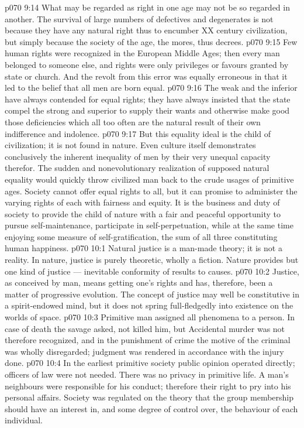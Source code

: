 \vs p070 9:14 What may be regarded as right in one age may not be so regarded in another. The survival of large numbers of defectives and degenerates is not because they have any natural right thus to encumber XX century civilization, but simply because the society of the age, the mores, thus decrees.
\vs p070 9:15 Few human rights were recognized in the European Middle Ages; then every man belonged to someone else, and rights were only privileges or favours granted by state or church. And the revolt from this error was equally erroneous in that it led to the belief that all men are born equal.
\vs p070 9:16 The weak and the inferior have always contended for equal rights; they have always insisted that the state compel the strong and superior to supply their wants and otherwise make good those deficiencies which all too often are the natural result of their own indifference and indolence.
\vs p070 9:17 But this equality ideal is the child of civilization; it is not found in nature. Even culture itself demonstrates conclusively the inherent inequality of men by their very unequal capacity therefor. The sudden and nonevolutionary realization of supposed natural equality would quickly throw civilized man back to the crude usages of primitive ages. Society cannot offer equal rights to all, but it can promise to administer the varying rights of each with fairness and equity. It is the business and duty of society to provide the child of nature with a fair and peaceful opportunity to pursue self\hyp{}maintenance, participate in self\hyp{}perpetuation, while at the same time enjoying some measure of self\hyp{}gratification, the sum of all three constituting human happiness.
\vs p070 10:1 Natural justice is a man\hyp{}made theory; it is not a reality. In nature, justice is purely theoretic, wholly a fiction. Nature provides but one kind of justice --- inevitable conformity of results to causes.
\vs p070 10:2 Justice, as conceived by man, means getting one’s rights and has, therefore, been a matter of progressive evolution. The concept of justice may well be constitutive in a spirit\hyp{}endowed mind, but it does not spring full\hyp{}fledgedly into existence on the worlds of space.
\vs p070 10:3 Primitive man assigned all phenomena to a person. In case of death the savage asked, not  killed him, but  Accidental murder was not therefore recognized, and in the punishment of crime the motive of the criminal was wholly disregarded; judgment was rendered in accordance with the injury done.
\vs p070 10:4 \pc In the earliest primitive society public opinion operated directly; officers of law were not needed. There was no privacy in primitive life. A man’s neighbours were responsible for his conduct; therefore their right to pry into his personal affairs. Society was regulated on the theory that the group membership should have an interest in, and some degree of control over, the behaviour of each individual.

